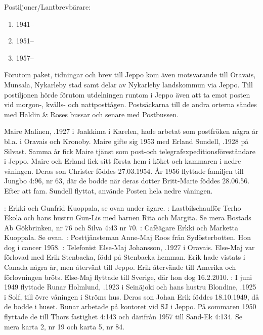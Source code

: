 Postiljoner/Lantbrevbärare:
\begin{enumerate}
  \item {}     1941--
  \item {} 1951--
  \item {}     1957--
\end{enumerate}
Förutom paket, tidningar och brev till Jeppo kom även motsvarande till Oravais, Munsala, Nykarleby stad samt delar av Nykarleby landskommun via Jeppo. Till postiljonen hörde förutom utdelningen runtom i Jeppo även att ta emot posten vid morgon-, kvälls- och nattposttågen. Postsäckarna till de andra orterna sändes med Haldin \& Roses bussar och senare med Postbussen.

Maire Malinen, .1927 i Jaakkima i Karelen, hade arbetat som postfröken några år bl.a. i Oravais och Kronoby. Maire gifte sig 1953	med Erland Sundell, .1928 på Silvast. Samma år fick Maire tjänst som post-och telegrafexpeditionsföreståndare i Jeppo. Maire och Erland fick sitt första hem i köket och kammaren i nedre våningen. Deras son Christer föddes 27.03.1954. År 1956 flyttade familjen till Jungbo	4:96, nr 63, där de bodde när deras dotter Britt-Marie föddes 28.06.56.	Efter att fam. Sundell flyttat, använde Posten hela nedre våningen.



:  Erkki och Gunfrid Kuoppala, se ovan under ägare.
:  Lastbilschaufför Terho Ekola och hans hustru Gun-Lis med barnen Rita och Margita. Se mera Bostads Ab Gökbrinken, nr 76 och Silva 4:43 nr 70.
:  Cafèägare Erkki och Marketta Kuoppala. Se ovan.
:  Posttjänsteman Anne-Maj Roos från Sydösterbotten. Hon dog i cancer 1958.
:  Telefonist Else-Maj Johansson, .1927 i Oravais. Else-Maj var förlovad med Erik Stenbacka, född på Stenbacka hemman. Erik hade vistats i Canada några år, men återvänt till Jeppo. Erik återvände till Amerika och förlovningen bröts. Else-Maj flyttade till Sverige, där hon dog 16.2.2010.
:  I juni 1949 flyttade Runar Holmlund, .1923 i Seinäjoki och hans hustru Blondine, .1925 i Solf, till övre våningen i Ströms hus. Deras son Johan Erik föddes 18.10.1949, då de bodde i huset. Runar arbetade på kontoret vid SJ i Jeppo. På sommaren 1950 flyttade de till Thors fastighet 4:143 och därifrån 1957 till Sand-Ek 4:134. Se mera karta 2, nr 19 och karta 5, nr 84.


